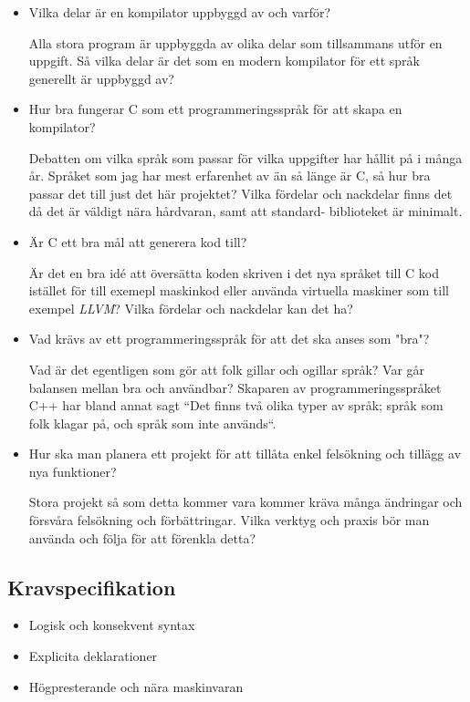 \documentclass{theme}
\begin{document}
\begin{itemize}
	\item Vilka delar är en kompilator uppbyggd av och varför?
		
		Alla stora program är uppbyggda av olika delar som tillsammans utför en 
		uppgift. Så vilka delar är det som en modern kompilator för ett språk
		generellt är uppbyggd av?

	\item Hur bra fungerar C som ett programmeringsspråk för att skapa en 
		kompilator?

		Debatten om vilka språk som passar för vilka uppgifter har hållit på i 
		många år. Språket som jag har mest erfarenhet av än så länge är C, så
		hur bra passar det till just det här projektet? Vilka fördelar och 
		nackdelar finns det då det är väldigt nära hårdvaran, samt att standard-
		biblioteket är minimalt.

	\item Är C ett bra mål att generera kod till?

		Är det en bra idé att översätta koden skriven i det nya språket till C
		kod istället för till exemepl maskinkod eller använda virtuella maskiner
		som till exempel \textit{LLVM}? Vilka fördelar och nackdelar kan det ha?

	\item Vad krävs av ett programmeringsspråk för att det ska anses som "bra"?

		Vad är det egentligen som gör att folk gillar och ogillar språk? Var 
		går balansen mellan bra och användbar? Skaparen av programmeringsspråket
		C++ har bland annat sagt ``Det finns två olika typer av språk; språk som
		folk klagar på, och språk som inte används``. 

	\item Hur ska man planera ett projekt för att tillåta enkel felsökning och 
		tillägg av nya funktioner?

		Stora projekt så som detta kommer vara kommer kräva många ändringar och
		försvåra felsökning och förbättringar. Vilka verktyg och praxis bör man
		använda och följa för att förenkla detta?

\end{itemize}

\subsection{Kravspecifikation}

\begin{itemize}
	\item Logisk och konsekvent syntax
	\item Explicita deklarationer
	\item Högpresterande och nära maskinvaran
\end{itemize}
\end{document}
